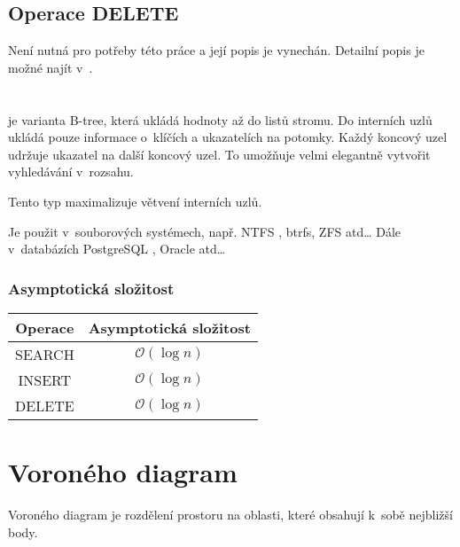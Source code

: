 \subsection{Operace DELETE}

Není nutná pro potřeby této práce a její popis je vynechán. Detailní
popis je možné najít v~\cite{Cormen:2001:IA:580470}.


\section{\BPTree\label{sec:B-plus-tree}}

\BPTree{} je varianta B-tree, která ukládá hodnoty až do
listů stromu. Do interních uzlů ukládá pouze informace o~klíčích
a ukazatelích na potomky. Každý koncový uzel udržuje ukazatel na další
koncový uzel. To umožňuje velmi elegantně vytvořit vyhledávání v~rozsahu.

Tento typ maximalizuje větvení interních uzlů.

Je použit v~souborových systémech, např. NTFS \cite{Carrier:2005:FSF:1051914}, btrfs, ZFS \cite{Powell:2012:ZBQ:2328941.2328946} atd\ldots{}
Dále v~databázích PostgreSQL \cite{Geschwinde:2001:PDH:580250}, Oracle \cite{Kyte:2003:EOD:1593880} atd\ldots{}

\begin{figure}[t]
\caption{\BPTree}
\end{figure}



\subsubsection{Asymptotická složitost}

\begin{tabular}{|c|c|}
\hline 
Operace & Asymptotická složitost\tabularnewline
\hline 
\hline 
SEARCH & $\mathcal{O}(\log n)$\tabularnewline
\hline 
INSERT & $\mathcal{O}(\log n)$\tabularnewline
\hline 
DELETE & $\mathcal{O}(\log n)$\tabularnewline
\hline 
\end{tabular}


\section{Voroného diagram}
Voroného diagram je rozdělení prostoru na oblasti, které obsahují k~sobě nejbližší body\cite{dorst2010geometric}.
